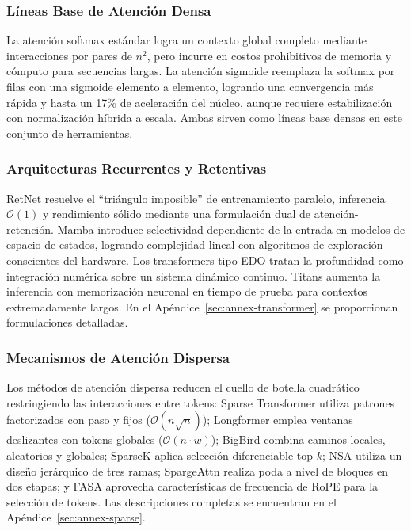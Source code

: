 \documentclass[11pt,a4paper]{article}
\begin{document}
\subsubsection{Líneas Base de Atención Densa}
La atención softmax estándar \citep{vaswani_attention_2017} logra un contexto global completo mediante interacciones por pares de $n^2$, pero incurre en costos prohibitivos de memoria y cómputo para secuencias largas. La atención sigmoide \citep{ramapuram_theory_2024} reemplaza la softmax por filas con una sigmoide elemento a elemento, logrando una convergencia más rápida y hasta un 17\% de aceleración del núcleo, aunque requiere estabilización con normalización híbrida a escala. Ambas sirven como líneas base densas en este conjunto de herramientas.

\subsubsection{Arquitecturas Recurrentes y Retentivas}
RetNet \citep{sun_retentive_2023} resuelve el ``triángulo imposible'' de entrenamiento paralelo, inferencia $\mathcal{O}(1)$ y rendimiento sólido mediante una formulación dual de atención-retención. Mamba \citep{gu_mamba_2023} introduce selectividad dependiente de la entrada en modelos de espacio de estados, logrando complejidad lineal con algoritmos de exploración conscientes del hardware. Los transformers tipo EDO \citep{zhang_continuous_2021} tratan la profundidad como integración numérica sobre un sistema dinámico continuo. Titans \citep{behrouz_titans_2025} aumenta la inferencia con memorización neuronal en tiempo de prueba para contextos extremadamente largos. En el Apéndice~\ref{sec:annex-transformer} se proporcionan formulaciones detalladas.

\subsubsection{Mecanismos de Atención Dispersa}
Los métodos de atención dispersa reducen el cuello de botella cuadrático restringiendo las interacciones entre tokens: Sparse Transformer \citep{child_sparse_transformer_2019} utiliza patrones factorizados con paso y fijos ($\mathcal{O}(n\sqrt{n})$); Longformer \citep{beltagy_longformer_2020} emplea ventanas deslizantes con tokens globales ($\mathcal{O}(n \cdot w)$); BigBird \citep{zaheer_bigbird_2020} combina caminos locales, aleatorios y globales; SparseK \citep{lou_sparsek_2024} aplica selección diferenciable top-$k$; NSA \citep{yuan_nsa_2025} utiliza un diseño jerárquico de tres ramas; SpargeAttn \citep{zhang_spargeattn_2025} realiza poda a nivel de bloques en dos etapas; y FASA \citep{wang_fasa_2026} aprovecha características de frecuencia de RoPE para la selección de tokens. Las descripciones completas se encuentran en el Apéndice~\ref{sec:annex-sparse}.
\end{document}
